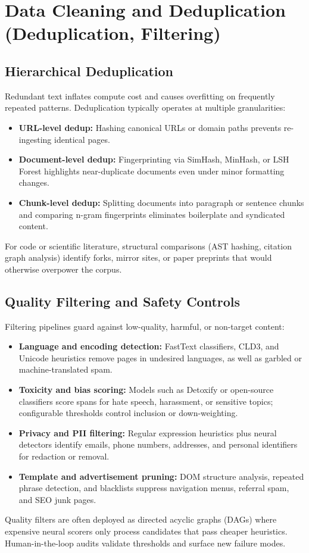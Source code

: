\documentclass{article}
\begin{document}
\section{Data Cleaning and Deduplication (Deduplication, Filtering)}
\subsection{Hierarchical Deduplication}
Redundant text inflates compute cost and causes overfitting on frequently repeated patterns. Deduplication typically operates at multiple granularities:
\begin{itemize}
  \item \textbf{URL-level dedup:} Hashing canonical URLs or domain paths prevents re-ingesting identical pages.
  \item \textbf{Document-level dedup:} Fingerprinting via SimHash, MinHash, or LSH Forest highlights near-duplicate documents even under minor formatting changes.
  \item \textbf{Chunk-level dedup:} Splitting documents into paragraph or sentence chunks and comparing n-gram fingerprints eliminates boilerplate and syndicated content.
\end{itemize}
For code or scientific literature, structural comparisons (AST hashing, citation graph analysis) identify forks, mirror sites, or paper preprints that would otherwise overpower the corpus.

\subsection{Quality Filtering and Safety Controls}
Filtering pipelines guard against low-quality, harmful, or non-target content:
\begin{itemize}
  \item \textbf{Language and encoding detection:} FastText classifiers, CLD3, and Unicode heuristics remove pages in undesired languages, as well as garbled or machine-translated spam.
  \item \textbf{Toxicity and bias scoring:} Models such as Detoxify or open-source classifiers score spans for hate speech, harassment, or sensitive topics; configurable thresholds control inclusion or down-weighting.
  \item \textbf{Privacy and PII filtering:} Regular expression heuristics plus neural detectors identify emails, phone numbers, addresses, and personal identifiers for redaction or removal.
  \item \textbf{Template and advertisement pruning:} DOM structure analysis, repeated phrase detection, and blacklists suppress navigation menus, referral spam, and SEO junk pages.
\end{itemize}
Quality filters are often deployed as directed acyclic graphs (DAGs) where expensive neural scorers only process candidates that pass cheaper heuristics. Human-in-the-loop audits validate thresholds and surface new failure modes.
\end{document}

